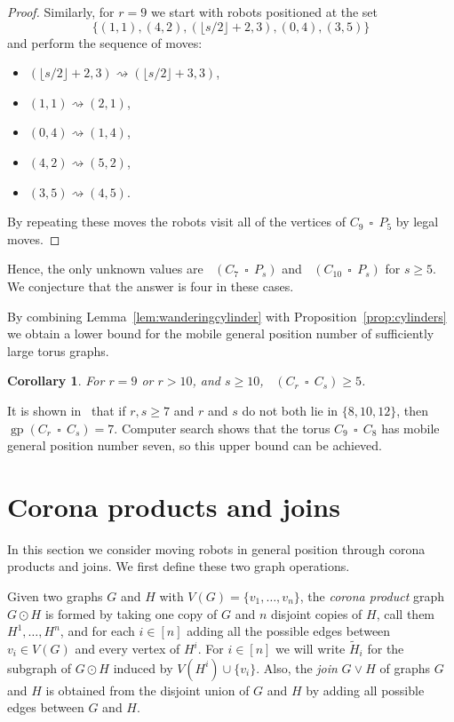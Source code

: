 \documentclass[a4paper,12pt]{article}
\DeclareMathOperator{\mob}{Mob_{gp}}
\DeclareMathOperator{\gp}{gp}
\DeclareMathOperator{\cp}{\,\square\,}
\newtheorem{corollary}[theorem]{Corollary}
\theoremstyle{definition}
\newcommand{\move}{\rightsquigarrow}
\begin{document}
\begin{proof}
		Similarly, for $r = 9$ we start with robots positioned at the set 
		\[ \{(1,1),(4,2),(\lfloor{s/2}\rfloor+2,3),(0,4),(3,5)\}\]
		and perform the sequence of moves:
		\begin{itemize}
			\item $(\lfloor{s/2}\rfloor+2,3) \move (\lfloor{s/2}\rfloor+3,3)$,
			\item $(1,1) \move (2,1)$,
			\item $(0,4) \move (1,4)$,
			\item $(4,2) \move (5,2)$,
			\item $(3,5) \move (4,5)$.
		\end{itemize}
		By repeating these moves the robots visit all of the vertices of $C_9 \cp P_5$ by legal moves.
	\end{proof}
	
	Hence, the only unknown values are $\mob (C_7 \cp P_s)$ and $\mob (C_{10} \cp P_s)$ for $s \geq 5$. We conjecture that the answer is four in these cases.
	
	By combining Lemma~\ref{lem:wanderingcylinder} with Proposition~\ref{prop:cylinders} we obtain a lower bound for the mobile general position number of sufficiently large torus graphs.
	\begin{corollary}
		\label{cor:Cr cp Cs}
		For $r = 9$ or $r > 10$, and $s \geq 10$, $\mob (C_r \cp C_s) \geq 5$.
	\end{corollary}
	It is shown in~\cite{KorzeVesel} that if $r,s \geq 7$ and $r$ and $s$ do not both lie in $\{ 8,10,12\}$, then $\gp (C_r \cp C_s) = 7$. Computer search shows that the torus $C_9 \cp C_8$ has mobile general position number seven, so this upper bound can be achieved. 
	
	\section{Corona products and joins}
	\label{sec:corona+joins}
	
	In this section we consider moving robots in general position through corona products and joins. We first define these two graph operations. 
	
	Given two graphs $G$ and $H$ with $V(G) = \{v_1, \ldots ,v_{n}\}$, the {\em corona product} graph $G\odot H$ is formed by taking one copy of $G$ and $n$ disjoint copies of $H$, call them $H^1,\ldots, H^{n}$, and for each $i \in [n]$ adding all the possible edges between $v_i\in V(G)$ and every vertex of $H^i$. For $i \in [n]$ we will write $\widetilde{H}_i$ for the subgraph of $G \odot H$ induced by $V(H^i) \cup \{ v_i\}$. Also, the {\em join} $G\vee H$ of graphs $G$ and $H$ is obtained from the disjoint union of $G$ and $H$ by adding all possible edges between $G$ and $H$.
	
\end{document}
